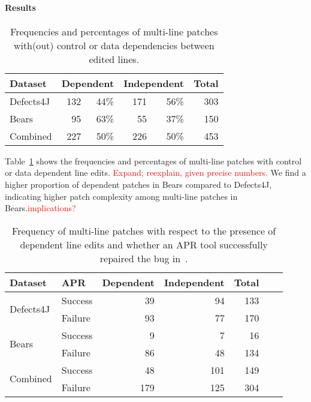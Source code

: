 \documentclass[sigconf, timestamp-false, anonymous=true]{acmart}
\newcommand\todo[1]{\textcolor{red}{#1}}
\begin{document}
\paragraph{Results}

\begin{table}
{\begin{center}
	\begin{tabular}{l | rr | rr | r}
		\toprule
		Dataset & \multicolumn{2}{c}{Dependent} & \multicolumn{2}{c}{Independent} & Total  \\
		\midrule
		Defects4J & 132  & 44\% & 171 & 56\% & 303 \\
		Bears & 95 & 63\% & 55 & 37\% & 150 \\
		Combined & 227 & 50\% & 226 & 50\% & 453 \\
		\bottomrule
	\end{tabular}
 \end{center}
}
	\caption{Frequencies and percentages of multi-line patches with(out) control or data 
	dependencies between edited lines.}
	\label{tab:dependency}
\end{table}

Table~\ref{tab:dependency} shows the 
frequencies and percentages of multi-line patches with control or data dependent 
line edits. \todo{Expand; reexplain, given precise numbers.}  We find a higher proportion of dependent patches in Bears compared to 
Defects4J, indicating higher patch complexity among multi-line patches in Bears.\todo{implications?}


\begin{table}
{\begin{center}
	\begin{tabular}{l | l | r r r r | r}
		\toprule
		Dataset & APR & Dependent & Independent & Total \\
		\midrule
		\multirow{2}{*}{Defects4J} & Success & 39 & 94 & 133 \\
		                                          & Failure   & 93 & 77 & 170 \\
		\midrule
		\multirow{2}{*}{Bears}       & Success &   9 &   7 &   16 \\
		                                          & Failure   & 86 & 48 & 134 \\
		\midrule
		\multirow{2}{*}{Combined}& Success & 48 &101& 149 \\
		                                          & Failure   &179&125& 304 \\
\bottomrule
	\end{tabular}
 \end{center}
}
	\caption{Frequency of multi-line patches with respect to the presence of 
	dependent line edits and whether an APR tool successfully 
	repaired the bug in~\cite{durieux-repair-them-all}.}
	\label{tab:dependency-repair-contingency-table}
\end{table}
\end{document}
